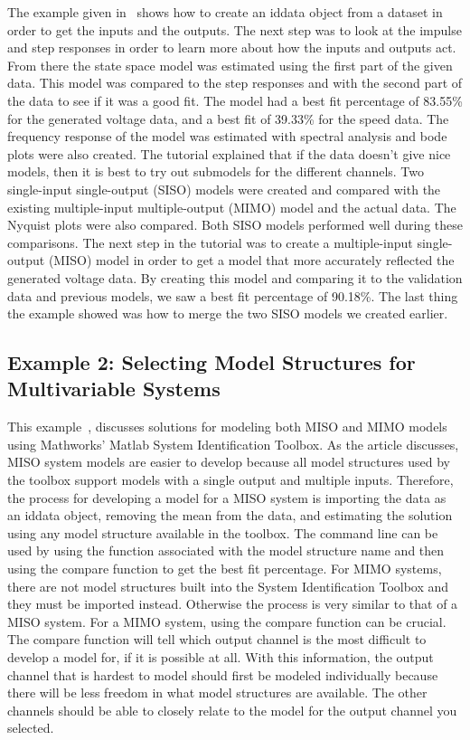 \documentclass[letterpaper,12pt]{article}   %
\begin{document}
The example given in~\cite{example1} shows how to create an iddata object from a
dataset in order to get the inputs and the outputs. The next step was to look at
the impulse and step responses in order to learn more about how the inputs and
outputs act. From there the state space model was estimated using the first part
of the given data. This model was compared to the step responses and with the
second part of the data to see if it was a good fit. The model had a best fit
percentage of 83.55\% for the generated voltage data, and a best fit of 39.33\%
for the speed data. The frequency response of the model was estimated with
spectral analysis and bode plots were also created. The tutorial explained that
if the data doesn’t give nice models, then it is best to try out submodels for
the different channels. Two single-input single-output (SISO) models were
created and compared with the existing multiple-input multiple-output (MIMO)
model and the actual data. The Nyquist plots were also compared. Both SISO
models performed well during these comparisons. The next step in the tutorial
was to create a multiple-input single-output (MISO) model in order to get a
model that more accurately reflected the generated voltage data. By creating
this model and comparing it to the validation data and previous models, we saw a
best fit percentage of 90.18\%. The last thing the example showed was how to
merge the two SISO models we created earlier.


\subsection{Example 2: Selecting Model Structures for Multivariable Systems}
\label{sec:sysID-Example2}
This example~\cite{Matlab2}, discusses solutions for modeling both MISO and MIMO models using Mathworks' Matlab System Identification Toolbox. As the article discusses, MISO system models are easier to develop because all model structures used by the toolbox support models with a single output and multiple inputs. Therefore, the process for developing a model for a MISO system is importing the data as an iddata object, removing the mean from the data, and estimating the solution using any model structure available in the toolbox. The command line can be used by using the function associated with the model structure name and then using the compare function to get the best fit percentage. For MIMO systems, there are not model structures built into the System Identification Toolbox and they must be imported instead. Otherwise the process is very similar to that of a MISO system. For a MIMO system, using the compare function can be crucial. The compare function will tell which output channel is the most difficult to develop a model for, if it is possible at all. With this information, the output channel that is hardest to model should first be modeled individually because there will be less freedom in what model structures are available. The other channels should be able to closely relate to the model for the output channel you selected.
\end{document}
